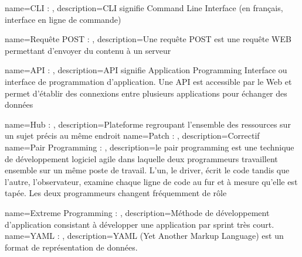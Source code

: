 {
    name=CLI : ,
    description={CLI signifie Command Line Interface (en français, interface en ligne de commande)}
}

{
    name=Requête POST : ,
    description={Une requête POST est une requête WEB permettant d'envoyer du contenu à un serveur}
}

{
    name=API : ,
    description={API signifie Application Programming Interface ou interface de programmation d’application. Une API est accessible par le Web et permet d’établir des connexions entre plusieurs applications pour échanger des données}
}

{
    name=Hub : ,
    description={Plateforme regroupant l’ensemble des ressources sur un sujet précis au même endroit}
}
{
    name=Patch : ,
    description={Correctif}
}
{
    name=Pair Programming : ,
    description={le pair programming est une technique de développement logiciel agile dans laquelle deux programmeurs travaillent ensemble sur un même poste de travail. L’un, le driver, écrit le code tandis que l’autre, l’observateur, examine chaque ligne de code au fur et à mesure qu’elle est tapée. Les deux programmeurs changent fréquemment de rôle}
}

{
    name=Extreme Programming : ,
    description={Méthode de développement d'application consistant à développer une application par sprint très court.}
}
{
    name=YAML : ,
    description={YAML (Yet Another Markup Language) est un format de représentation de données.}
}
